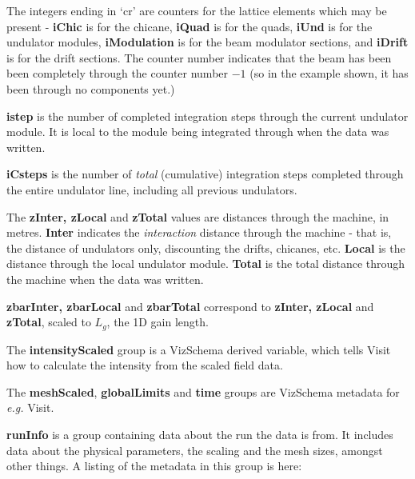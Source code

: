 \documentclass[12pt]{article}%
\begin{document}
The integers ending in `cr' are counters for the lattice elements which may be present - {\bf iChic} is for the chicane, {\bf iQuad} is for the quads, {\bf iUnd} is for the undulator modules, {\bf iModulation} is for the beam modulator sections, and {\bf iDrift} is for the drift sections. The counter number indicates that the beam has been been completely through the counter number $-1$ (so in the example shown, it has been through no components yet.)

{\bf istep} is the number of completed integration steps through the current undulator module. It is local to the module being integrated through when the data was written.

{\bf iCsteps} is the number of \textit{total} (cumulative) integration steps completed through the entire undulator line, including all previous undulators. 

The {\bf zInter, zLocal} and {\bf zTotal} values are distances through the machine, in metres. {\bf Inter} indicates the \textit{interaction} distance through the machine - that is, the distance of undulators only, discounting the drifts, chicanes, etc. {\bf Local} is the distance through the local undulator module. {\bf Total} is the total distance through the machine when the data was written.

{\bf zbarInter, zbarLocal} and {\bf zbarTotal} correspond to {\bf zInter, zLocal} and {\bf zTotal}, scaled to $L_g$, the 1D gain length.


The {\bf intensityScaled} group is a VizSchema derived variable, which tells Visit how to calculate the intensity from the scaled field data.

The {\bf meshScaled}, {\bf globalLimits} and {\bf time} groups are VizSchema metadata for \textit{e.g.} Visit. 

{\bf runInfo} is a group containing data about the run the data is from. It includes data about the physical parameters, the scaling and the mesh sizes, amongst other things. A listing of the metadata in this group is here:
\end{document}
